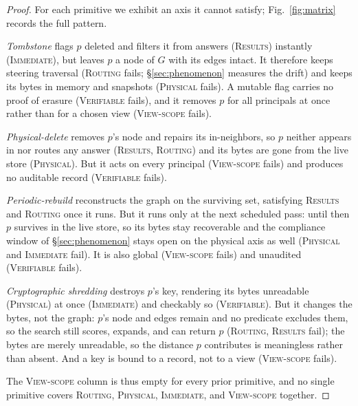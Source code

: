 \documentclass[sigconf, nonacm, review]{acmart}
\begin{document}
\begin{proof}
For each primitive we exhibit an axis it cannot satisfy;
Fig.~\ref{fig:matrix} records the full pattern.

\emph{Tombstone} flags $p$ deleted and filters it from answers
(\textsc{Results}) instantly (\textsc{Immediate}), but leaves $p$ a node of
$G$ with its edges intact. It therefore keeps steering traversal
(\textsc{Routing} fails; \S\ref{sec:phenomenon} measures the drift)
and keeps its bytes in memory and snapshots (\textsc{Physical} fails). A
mutable flag carries no proof of erasure (\textsc{Verifiable} fails), and
it removes $p$ for all principals at once rather than for a chosen view
(\textsc{View-scope} fails).

\emph{Physical-delete} removes $p$'s node and repairs its in-neighbors,
so $p$ neither appears in nor routes any answer (\textsc{Results},
\textsc{Routing}) and its bytes are gone from the live store
(\textsc{Physical}). But it acts on every principal (\textsc{View-scope}
fails) and produces no auditable record (\textsc{Verifiable} fails).

\emph{Periodic-rebuild} reconstructs the graph on the surviving
set, satisfying \textsc{Results} and \textsc{Routing} once it runs. But it
runs only at the next scheduled pass: until then $p$ survives in the live
store, so its bytes stay recoverable and the compliance window of
\S\ref{sec:phenomenon} stays open on the physical axis as well
(\textsc{Physical} and \textsc{Immediate} fail). It is also global
(\textsc{View-scope} fails) and unaudited (\textsc{Verifiable} fails).

\begin{sloppypar}
\emph{Cryptographic shredding} destroys $p$'s key, rendering its bytes
unreadable (\textsc{Physical}) at once (\textsc{Immediate}) and checkably
so (\textsc{Verifiable}). But it changes the bytes, not the graph: $p$'s
node and edges remain and no predicate excludes them, so the search still
scores, expands, and can return $p$ (\textsc{Routing}, \textsc{Results}
fail); the bytes are merely unreadable, so the distance $p$ contributes is
meaningless rather than absent. And a key is bound to a record, not to a
view (\textsc{View-scope} fails).
\end{sloppypar}

The \textsc{View-scope} column is thus empty for every prior primitive, and
no single primitive covers \textsc{Routing}, \textsc{Physical},
\textsc{Immediate}, and \textsc{View-scope} together.
\end{proof}
\end{document}
